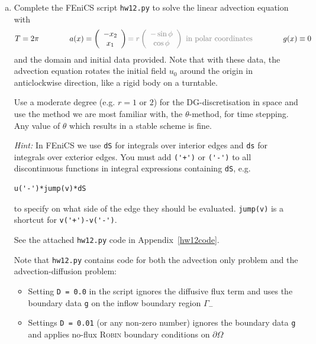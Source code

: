 \begin{enumerate}[(a)]
\newpage

\item Complete the \textsf{FEniCS} script \texttt{hw12.py} to solve the linear advection equation with
\begin{equation*}
T = 2\pi \qquad \qquad a(x) = \left(
\begin{array}{c}
-x_2\\ x_1
\end{array}
\right) \textcolor{gray}{ = r \left(
\begin{array}{c}
-\sin \phi \\ \cos \phi
\end{array}
\right)  \text{ in polar coordinates}}  \qquad \qquad  g(x) \equiv 0
\end{equation*}
and the domain and initial data provided. Note that with these data, the advection equation rotates the initial field $u_0$ around the origin in anticlockwise direction, like a rigid body on a turntable.

Use a moderate degree (e.g. $r=1$ or $2$) for the DG-discretisation in space and use the method we are most familiar with, the $\theta$-method, for time stepping. Any value of $\theta$ which results in a stable scheme is fine.

\emph{Hint:} In \textsf{FEniCS} we use \verb|dS| for integrals over interior edges and \verb|ds| for integrals over exterior edges. You must add \verb|('+')| or \verb|('-')| to all discontinuous functions in integral expressions containing \verb|dS|, e.g.
\begin{verbatim}
u('-')*jump(v)*dS
\end{verbatim}
to specify on what side of the edge they should be evaluated. \verb|jump(v)| is a shortcut for \verb|v('+')-v('-')|.

\vspace{0.5cm}
\begin{solution}
See the attached \texttt{hw12.py} code in Appendix~\ref{hw12code}.

Note that \texttt{hw12.py} contains code for both the advection only problem and the advection-diffusion problem:
\begin{itemize}
\item Setting \texttt{D = 0.0} in the script ignores the diffusive flux term and uses the boundary data \texttt{g} on the inflow boundary region $\Gamma_-$
\item Settings \texttt{D = 0.01} (or any non-zero number) ignores the boundary data \texttt{g} and applies no-flux \textsc{Robin} boundary conditions on $\partial\Omega$
\end{itemize}
\end{solution}
\vspace{1cm}


\end{enumerate}
